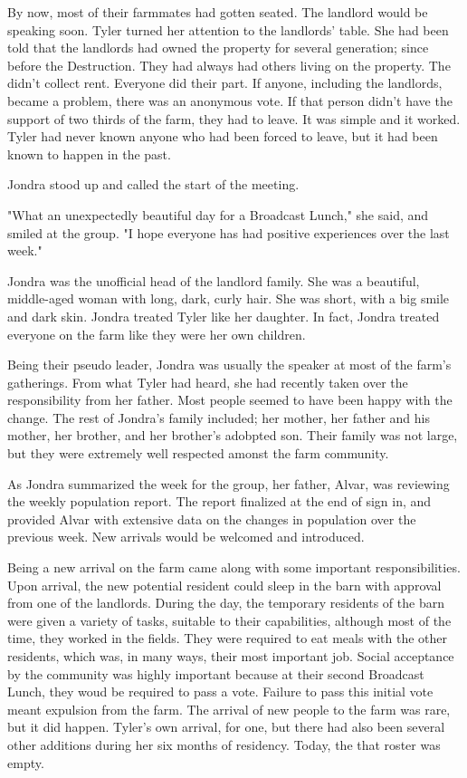 \documentclass[courier]{sffms}
\begin{document}
By now, most of their farmmates had gotten seated. The landlord would be speaking
soon. Tyler turned her attention to the landlords' table. She had been told that
the landlords had owned the
property for several generation; since before the Destruction. They had always
had others living on the property. The didn't collect rent. Everyone did their
part. If anyone, including the landlords, became a problem,
there was an anonymous vote. If that
person didn't have the support of two thirds of the farm, they had to leave.
It was simple and it worked. Tyler had never known anyone who had been
forced to leave, but it had been known to happen in the past.

Jondra stood up and called the start of the meeting.

"What an unexpectedly beautiful day for a Broadcast Lunch," she said, and smiled at the
group. "I hope everyone has had positive experiences over the last week."

Jondra was the unofficial head of the landlord family. She was a beautiful, middle-aged
woman with long, dark, curly hair. She was short, with a big smile and dark
skin. Jondra treated Tyler like her daughter. In fact, Jondra treated everyone on
the farm like they were her own children.

Being their pseudo leader, Jondra was usually the speaker
at most of the farm's gatherings.
From what Tyler had heard, she had recently taken over the responsibility
from her father. Most people seemed to have been happy with the change.
The rest of Jondra's family included;
her mother, her father and his mother, her brother, and her brother's adobpted son.
Their family was not large, but they were extremely well respected amonst the 
farm community.

As Jondra summarized the week for the group, her father, 
Alvar, was reviewing the weekly population report.
The report finalized at the end of sign in, and provided
Alvar with extensive data on the changes in population over the previous week.
New arrivals would be welcomed and introduced.

Being a new arrival on the farm came along with some important
responsibilities. Upon arrival, the new potential resident could
sleep in the barn with approval from one of the landlords. During
the day, the temporary residents of the barn were given a variety
of tasks, suitable to their capabilities, although most of the time, 
they worked in the fields. They were required to eat meals with
the other residents, which was, in many ways, their most important
job. Social acceptance by the community was highly important
because at their second Broadcast Lunch, they woud be required
to pass a vote. Failure to pass this initial vote meant expulsion
from the farm. The arrival of new people to the farm was rare,
but it did happen. Tyler's own arrival, for one, but there had
also been several other additions during her six months of residency.
Today, the that roster was empty.
\end{document}
